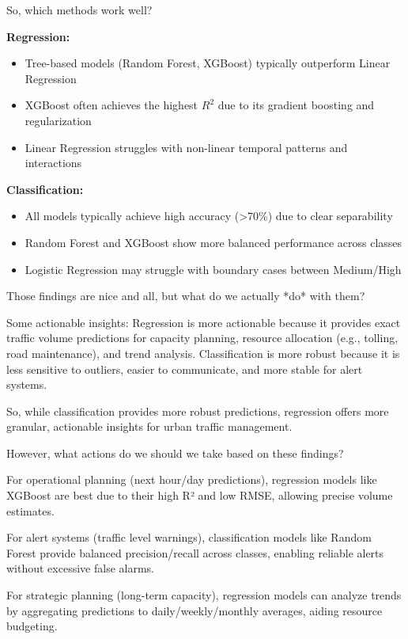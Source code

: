 \documentclass[12pt]{article}
\begin{document}
So, which methods work well?

\textbf{Regression:}
\begin{itemize}
    \item Tree-based models (Random Forest, XGBoost) typically outperform Linear Regression
    \item XGBoost often achieves the highest $R^2$ due to its gradient boosting and regularization
    \item Linear Regression struggles with non-linear temporal patterns and interactions
\end{itemize}

\textbf{Classification:}
\begin{itemize}
    \item All models typically achieve high accuracy (>70\%) due to clear separability
    \item Random Forest and XGBoost show more balanced performance across classes
    \item Logistic Regression may struggle with boundary cases between Medium/High
\end{itemize}

Those findings are nice and all, but what do we actually *do* with them? 

Some actionable insights: Regression is more actionable because it provides exact traffic volume predictions for capacity planning,
resource allocation (e.g., tolling, road maintenance), and trend analysis. 
Classification is more robust because it is less sensitive to outliers, easier to communicate, and more stable for alert systems.

So, while classification provides more robust predictions, regression offers more granular, actionable insights for urban traffic management.

However, what actions do we should we take based on these findings?

For operational planning (next hour/day predictions), regression models like XGBoost are best due to their high R² and low RMSE, allowing precise volume estimates.

For alert systems (traffic level warnings), classification models like Random Forest provide balanced precision/recall across classes, enabling reliable alerts without excessive false alarms.

For strategic planning (long-term capacity), regression models can analyze trends by aggregating predictions to daily/weekly/monthly averages, aiding resource budgeting.
\end{document}
